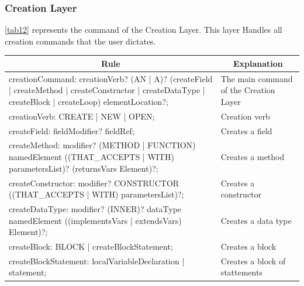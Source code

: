 \subsubsection{Creation Layer}
\autoref{tab12} represents the command of the Creation Layer. This layer Handles all creation commands that the user dictates.
\begin{table}[H]
\centering
\begin{tabular}{|p{10cm}|l|}
\hline
\multicolumn{1}{|c|}{{\bf Rule}}                                                                                                                        & \multicolumn{1}{c|}{{\bf Explanation}} \\ \hline
creationCommand: creationVerb? (AN | A)? (createField | createMethod | createConstructor | createDataType | createBlock | createLoop) elementLocation?; & The main command of the Creation Layer \\ \hline
creationVerb: CREATE | NEW | OPEN;                                                                                                                      & Creation verb                          \\ \hline
createField: fieldModifier? fieldRef;                                                                                                                   & Creates a field                        \\ \hline
createMethod: modifier? (METHOD | FUNCTION) namedElement ((THAT\_ACCEPTS | WITH) parametersList)? (returnsVars Element)?;                               & Creates a method                       \\ \hline
createConstructor: modifier? CONSTRUCTOR ((THAT\_ACCEPTS | WITH) parametersList)?;                                                                      & Creates a constructor                  \\ \hline
createDataType: modifier? (INNER)? dataType namedElement ((implementsVars | extendsVars) Element)?;                                                     & Creates a data type                    \\ \hline
createBlock: BLOCK | createBlockStatement;                                                                                                              & Creates a block                        \\ \hline
createBlockStatement: localVariableDeclaration | statement;                                                                                             & Creates a block of stattements         \\ \hline

\end{tabular}
\end{table}
